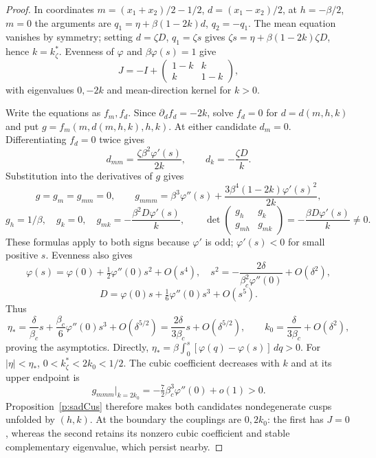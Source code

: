 \begin{proof}
In coordinates $m=(x_1+x_2)/2-1/2$, $d=(x_1-x_2)/2$, at
$h=-\beta/2$, $m=0$ the arguments are $q_1=\eta+\beta(1-2k)d$, $q_2=-q_1$.
The mean equation vanishes by symmetry; setting $d=\zeta D$, $q_1=\zeta s$
gives $\zeta s=\eta+\beta(1-2k)\zeta D$, hence $k=k_\zeta^*$.
Evenness of $\varphi$ and $\beta\varphi(s)=1$ give
\[
 J=-I+\begin{pmatrix}1-k&k\\k&1-k\end{pmatrix},
\]
with eigenvalues $0,-2k$ and mean-direction kernel for $k>0$.

Write the equations as $f_m,f_d$. Since $\partial_df_d=-2k$, solve
$f_d=0$ for $d=d(m,h,k)$ and put $g=f_m(m,d(m,h,k),h,k)$.
At either candidate $d_m=0$. Differentiating $f_d=0$ twice gives
\[
 d_{mm}=\frac{\zeta\beta^2\varphi'(s)}{2k},\qquad
 d_k=-\frac{\zeta D}{k}.
\]
Substitution into the derivatives of $g$ gives
\[
 g=g_m=g_{mm}=0,\qquad
 g_{mmm}=\beta^3\varphi''(s)+\frac{3\beta^4(1-2k)\varphi'(s)^2}{2k},
\]
\[
 g_h=1/\beta,\quad g_k=0,\quad g_{mk}=-\frac{\beta^2D\varphi'(s)}k,
 \qquad
 \det\begin{pmatrix}g_h&g_k\\g_{mh}&g_{mk}\end{pmatrix}
 =-\frac{\beta D\varphi'(s)}k\ne0.
\]
These formulas apply to both signs because $\varphi'$ is odd;
$\varphi'(s)<0$ for small positive $s$.
Evenness also gives
\[
 \varphi(s)=\varphi(0)+\tfrac12\varphi''(0)s^2+O(s^4),\quad
 s^2=-\frac{2\delta}{\beta_c^2\varphi''(0)}+O(\delta^2),
\]
\[
 D=\varphi(0)s+\tfrac16\varphi''(0)s^3+O(s^5).
\]
Thus
\[
 \eta_* =\frac\delta{\beta_c}s+\frac{\beta_c}6\varphi''(0)s^3
 +O(\delta^{5/2})=\frac{2\delta}{3\beta_c}s+O(\delta^{5/2}),
 \qquad k_0=\frac\delta{3\beta_c}+O(\delta^2),
\]
proving the asymptotics. Directly,
$\eta_* =\beta\int_0^s[\varphi(q)-\varphi(s)]\,dq>0$.
For $|\eta|<\eta_*$, $0<k_\zeta^*<2k_0<1/2$.
The cubic coefficient decreases with $k$ and at its upper endpoint is
\[
 g_{mmm}|_{k=2k_0}=-\tfrac72\beta_c^3\varphi''(0)+o(1)>0.
\]
Proposition~\ref{p:sadCus} therefore makes both candidates
nondegenerate cusps unfolded by $(h,k)$.
At the boundary the couplings are $0,2k_0$: the first has $J=0$,
whereas the second retains its nonzero cubic coefficient and stable
complementary eigenvalue, which persist nearby.
\end{proof}

